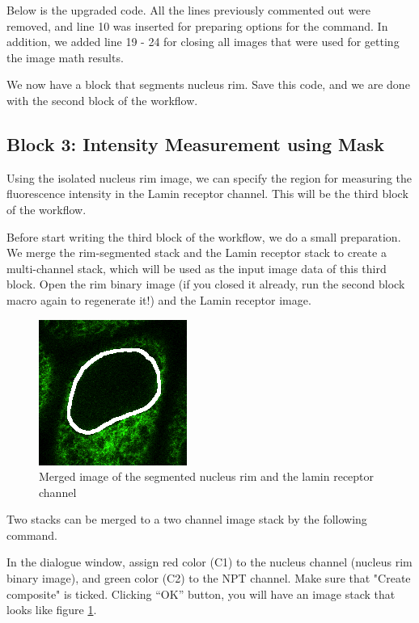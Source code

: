Below is the upgraded code. All the lines previously commented out were removed, and line 10 was inserted for preparing options for the  command. In addition, we added line 19 - 24 for closing all images that were used for getting the image math results. 



We now have a block that segments nucleus rim. Save this code, and we are done with the second block of the workflow. 

\subsection{Block 3: Intensity Measurement using Mask}

Using the isolated nucleus rim image, we can specify the region for measuring the fluorescence intensity in the Lamin receptor channel. This will be the third block of the workflow. 

Before start writing the third block of the workflow, we do a small preparation. We merge the rim-segmented stack and the Lamin receptor stack to create a multi-channel stack, which will be used as the input image data of this third block. Open the rim binary image (if you closed it already, run the second block macro again to regenerate it!) and the Lamin receptor image.  

\begin{figure}[!ht]
\begin{center}
\includegraphics[scale=1.0]{fig/NucRimNPTMerged.png}
\caption{Merged image of the segmented nucleus rim and the lamin receptor  channel}
\label{fig:NucRimMerged}
\end{center}
\end{figure}

Two stacks can be merged to a two channel image stack by the following command.  


In the dialogue window, assign red color (C1) to the nucleus channel (nucleus rim binary image), and  green color (C2) to the NPT channel. Make sure that "Create composite" is ticked. Clicking ``OK'' button, you will have an image stack that looks like figure \ref{fig:NucRimMerged}.

